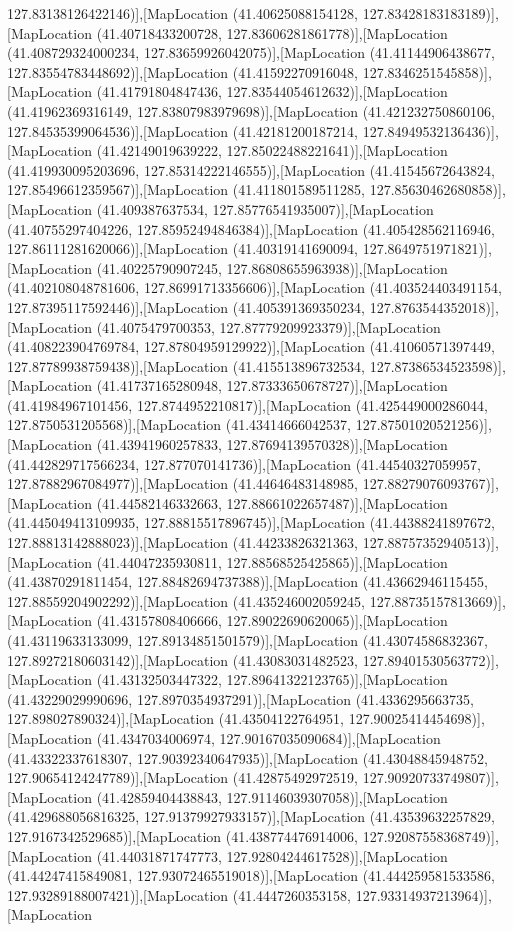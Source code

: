 127.83138126422146)],[MapLocation (41.40625088154128, 127.83428183183189)],[MapLocation (41.40718433200728, 127.83606281861778)],[MapLocation (41.408729324000234, 127.83659926042075)],[MapLocation (41.41144906438677, 127.83554783448692)],[MapLocation (41.41592270916048, 127.8346251545858)],[MapLocation (41.41791804847436, 127.83544054612632)],[MapLocation (41.41962369316149, 127.83807983979698)],[MapLocation (41.421232750860106, 127.84535399064536)],[MapLocation (41.42181200187214, 127.84949532136436)],[MapLocation (41.42149019639222, 127.85022488221641)],[MapLocation (41.419930095203696, 127.85314222146555)],[MapLocation (41.41545672643824, 127.85496612359567)],[MapLocation (41.411801589511285, 127.85630462680858)],[MapLocation (41.409387637534, 127.85776541935007)],[MapLocation (41.40755297404226, 127.85952494846384)],[MapLocation (41.405428562116946, 127.86111281620066)],[MapLocation (41.40319141690094, 127.8649751971821)],[MapLocation (41.40225790907245, 127.86808655963938)],[MapLocation (41.402108048781606, 127.86991713356606)],[MapLocation (41.403524403491154, 127.87395117592446)],[MapLocation (41.405391369350234, 127.8763544352018)],[MapLocation (41.4075479700353, 127.87779209923379)],[MapLocation (41.408223904769784, 127.87804959129922)],[MapLocation (41.41060571397449, 127.87789938759438)],[MapLocation (41.415513896732534, 127.87386534523598)],[MapLocation (41.41737165280948, 127.87333650678727)],[MapLocation (41.41984967101456, 127.8744952210817)],[MapLocation (41.425449000286044, 127.8750531205568)],[MapLocation (41.43414666042537, 127.87501020521256)],[MapLocation (41.43941960257833, 127.87694139570328)],[MapLocation (41.442829717566234, 127.877070141736)],[MapLocation (41.44540327059957, 127.87882967084977)],[MapLocation (41.44646483148985, 127.88279076093767)],[MapLocation (41.44582146332663, 127.88661022657487)],[MapLocation (41.445049413109935, 127.88815517896745)],[MapLocation (41.44388241897672, 127.88813142888023)],[MapLocation (41.44233826321363, 127.88757352940513)],[MapLocation (41.44047235930811, 127.88568525425865)],[MapLocation (41.43870291811454, 127.88482694737388)],[MapLocation (41.43662946115455, 127.88559204902292)],[MapLocation (41.435246002059245, 127.88735157813669)],[MapLocation (41.43157808406666, 127.89022690620065)],[MapLocation (41.43119633133099, 127.89134851501579)],[MapLocation (41.43074586832367, 127.89272180603142)],[MapLocation (41.43083031482523, 127.89401530563772)],[MapLocation (41.43132503447322, 127.89641322123765)],[MapLocation (41.43229029990696, 127.8970354937291)],[MapLocation (41.4336295663735, 127.898027890324)],[MapLocation (41.43504122764951, 127.90025414454698)],[MapLocation (41.4347034006974, 127.90167035090684)],[MapLocation (41.43322337618307, 127.90392340647935)],[MapLocation (41.43048845948752, 127.90654124247789)],[MapLocation (41.42875492972519, 127.90920733749807)],[MapLocation (41.42859404438843, 127.91146039307058)],[MapLocation (41.429688056816325, 127.91379927933157)],[MapLocation (41.43539632257829, 127.9167342529685)],[MapLocation (41.438774476914006, 127.92087558368749)],[MapLocation (41.44031871747773, 127.92804244617528)],[MapLocation (41.44247415849081, 127.93072465519018)],[MapLocation (41.444259581533586, 127.93289188007421)],[MapLocation (41.4447260353158, 127.93314937213964)],[MapLocation 